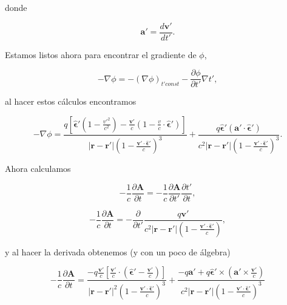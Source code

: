 \documentclass[a4paper,11pt]{article}
\numberwithin{equation}{section}
\begin{document}
donde 

\begin{equation}
 \mathbf{a}' = \frac{d\mathbf{v}'}{dt'}.
\end{equation}

Estamos listos ahora para encontrar el gradiente de $\phi$, 

\begin{equation}
 - \nabla \phi = - (\nabla \phi)_{t'const} - \frac{\partial \phi}{\partial t'}
 \nabla t',
\end{equation}

al hacer estos cálculos encontramos 

\begin{equation}
 - \nabla \phi = \frac{q\left[\hat{\mathbf{\epsilon}}' \left(1 - 
 \frac{v'^2}{c^2}\right) - \frac{\mathbf{v}'}{c}\left(1 - \frac{v}{c}\cdot 
 \hat{\mathbf{\epsilon}}'\right) \right]}{|\mathbf{r} - \mathbf{r}'| 
 \left(1 - \frac{\mathbf{v}' \cdot \hat{\mathbf{\epsilon}}'}{c}\right)^3} 
 + \frac{q\hat{\mathbf{\epsilon}}'(\mathbf{a}' \cdot \hat{\mathbf{\epsilon}}')}{ 
 c^2|\mathbf{r} - \mathbf{r}'|\left(1 - \frac{\mathbf{v}' \cdot 
 \hat{\mathbf{\epsilon}}'}{c} \right)^3}.
\end{equation}

Ahora calculamos 

\begin{equation}
 - \frac{1}{c}\frac{\partial\mathbf{A}}{\partial t} = - \frac{1}{c} 
 \frac{\partial \mathbf{A}}{\partial t'}\frac{\partial t'}{\partial t},
\end{equation}

\begin{equation}
 - \frac{1}{c}\frac{\partial\mathbf{A}}{\partial t} = - \frac{\partial}{\partial t'} 
 \frac{q\mathbf{v}'}{c^2|\mathbf{r} - \mathbf{r}'|\left(1 - \frac{\mathbf{v}' 
 \cdot \hat{\mathbf{\epsilon}}'}{c} \right)},
\end{equation}

y al hacer la derivada obtenemos (y con un poco de álgebra)

\begin{equation}
 - \frac{1}{c}\frac{\partial\mathbf{A}}{\partial t} = \frac{-q \frac{\mathbf{v}'}{c} 
 \left[\frac{\mathbf{v}'}{c} \cdot \left(\hat{\mathbf{\epsilon}}' - 
 \frac{\mathbf{v}'}{c}\right)\right]}{|\mathbf{r} - \mathbf{r}'|^2 
 \left(1 - \frac{\mathbf{v}'\cdot \hat{\mathbf{\epsilon}}'}{c} \right)^3} + 
 \frac{-q\mathbf{a}' + q\hat{\mathbf{\epsilon}}' \times \left(\mathbf{a}' 
 \times \frac{\mathbf{v}'}{c}\right)}{c^2|\mathbf{r} - \mathbf{r}'|
  \left(1 - \frac{\mathbf{v}'\cdot \hat{\mathbf{\epsilon}}'}{c} \right)^3}
\end{equation}
\end{document}
